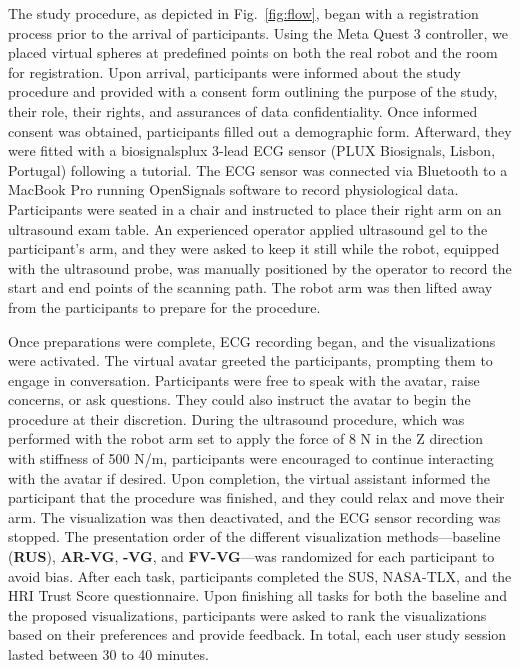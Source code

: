 The study procedure, as depicted in Fig.~\ref{fig:flow}, began with a registration process prior to the arrival of participants. Using the Meta Quest 3 controller, we placed virtual spheres at predefined points on both the real robot and the room for registration. 
Upon arrival, participants were informed about the study procedure and provided with a consent form outlining the purpose of the study, their role, their rights, and assurances of data confidentiality. Once informed consent was obtained, participants filled out a demographic form. Afterward, they were fitted with a biosignalsplux 3-lead ECG sensor (PLUX Biosignals, Lisbon, Portugal) following a tutorial. The ECG sensor was connected via Bluetooth to a MacBook Pro running OpenSignals software to record physiological data.
Participants were seated in a chair and instructed to place their right arm on an ultrasound exam table. An experienced operator applied ultrasound gel to the participant's arm, and they were asked to keep it still while the robot, equipped with the ultrasound probe, was manually positioned by the operator to record the start and end points of the scanning path. The robot arm was then lifted away from the participants to prepare for the procedure.

Once preparations were complete, ECG recording began, and the visualizations were activated. The virtual avatar greeted the participants, prompting them to engage in conversation. Participants were free to speak with the avatar, raise concerns, or ask questions. They could also instruct the avatar to begin the procedure at their discretion. During the ultrasound procedure, which was performed with the robot arm set to apply the force of 8 N in the Z direction with stiffness of 500 N/m, participants were encouraged to continue interacting with the avatar if desired.
Upon completion, the virtual assistant informed the participant that the procedure was finished, and they could relax and move their arm. The visualization was then deactivated, and the ECG sensor recording was stopped. The presentation order of the different visualization methods—baseline (\textbf{RUS}), \textbf{AR-VG}, \textbf{-VG}, and \textbf{FV-VG}—was randomized for each participant to avoid bias.
After each task, participants completed the SUS, NASA-TLX, and the HRI Trust Score questionnaire. Upon finishing all tasks for both the baseline and the proposed visualizations, participants were asked to rank the visualizations based on their preferences and provide feedback. In total, each user study session lasted between 30 to 40 minutes.

